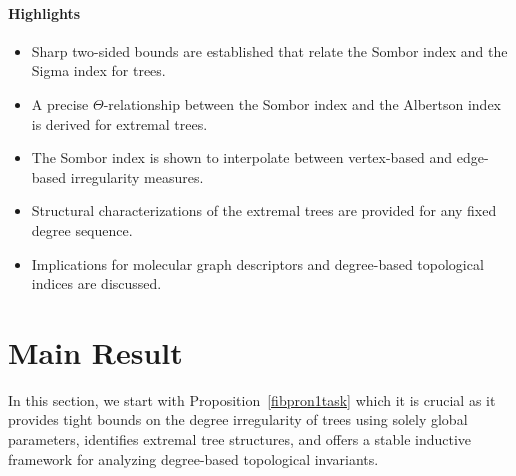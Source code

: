 \documentclass[12pt, a4paper]{article}
\begin{document}
\paragraph*{Highlights}
\begin{itemize}
  \item Sharp two-sided bounds are established that relate the Sombor index and the Sigma index for trees.
  \item A precise $\Theta$-relationship between the Sombor index and the Albertson index is derived for extremal trees.
  \item The Sombor index is shown to interpolate between vertex-based and edge-based irregularity measures.
  \item Structural characterizations of the extremal trees are provided for any fixed degree sequence.
  \item Implications for molecular graph descriptors and degree-based topological indices are discussed.
\end{itemize}


\section{Main Result}
In this section, we start with Proposition~\ref{fibpron1task} which it is crucial as it provides tight bounds on the degree irregularity of trees using solely global parameters, identifies extremal tree structures, and offers a stable inductive framework for analyzing degree-based topological invariants.
\end{document}
